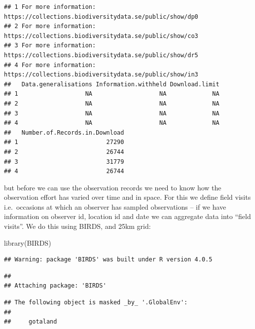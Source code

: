 \documentclass[
  10pt,
]{article}
\newenvironment{Shaded}{\begin{snugshade}}{\end{snugshade}}
\newcommand{\AttributeTok}[1]{\textcolor[rgb]{0.77,0.63,0.00}{#1}}
\newcommand{\FunctionTok}[1]{\textcolor[rgb]{0.00,0.00,0.00}{#1}}
\newcommand{\NormalTok}[1]{#1}
\newcommand{\OtherTok}[1]{\textcolor[rgb]{0.56,0.35,0.01}{#1}}
\newcommand{\SpecialCharTok}[1]{\textcolor[rgb]{0.00,0.00,0.00}{#1}}
\newcommand{\StringTok}[1]{\textcolor[rgb]{0.31,0.60,0.02}{#1}}
\begin{document}
\begin{verbatim}
## 1 For more information: https://collections.biodiversitydata.se/public/show/dp0
## 2 For more information: https://collections.biodiversitydata.se/public/show/co3
## 3 For more information: https://collections.biodiversitydata.se/public/show/dr5
## 4 For more information: https://collections.biodiversitydata.se/public/show/in3
##   Data.generalisations Information.withheld Download.limit
## 1                   NA                   NA             NA
## 2                   NA                   NA             NA
## 3                   NA                   NA             NA
## 4                   NA                   NA             NA
##   Number.of.Records.in.Download
## 1                         27290
## 2                         26744
## 3                         31779
## 4                         26744
\end{verbatim}

but before we can use the observation records we need to know how the observation effort has varied over time and in space. For this we define field visits i.e.~occasions at which an observer has sampled observations -- if we have information on observer id, location id and date we can aggregate data into ``field visits''. We do this using BIRDS, and 25km grid:

\begin{Shaded}
\begin{Highlighting}[]
\FunctionTok{library}\NormalTok{(BIRDS)}
\end{Highlighting}
\end{Shaded}

\begin{verbatim}
## Warning: package 'BIRDS' was built under R version 4.0.5
\end{verbatim}

\begin{verbatim}
## 
## Attaching package: 'BIRDS'
\end{verbatim}

\begin{verbatim}
## The following object is masked _by_ '.GlobalEnv':
## 
##     gotaland
\end{verbatim}

\begin{Shaded}
\end{Shaded}
\end{document}
